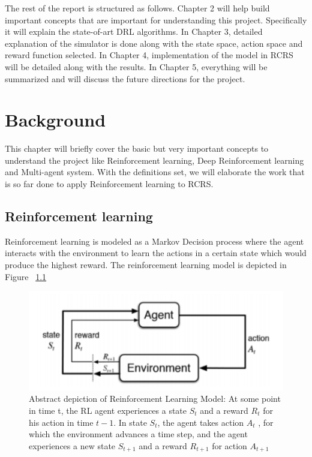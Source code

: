 \documentclass[12pt]{report}
\begin{document}
The rest of the report is structured as follows. Chapter 2 will help build important concepts that are important for understanding this project. Specifically it will explain the state-of-art DRL algorithms. In Chapter 3, detailed explanation of the simulator is done along with the state space, action space and reward function selected. In Chapter 4, implementation of the model in RCRS will be detailed along with the results. In Chapter 5, everything will be summarized and will discuss the future directions for the project. 


\chapter{Background}                       

This chapter will briefly cover the basic but very important concepts to understand the project like Reinforcement learning, Deep Reinforcement learning and Multi-agent system. With the definitions set, we will elaborate the work that is so far done to apply Reinforcement learning to RCRS. 

\section{Reinforcement learning}

Reinforcement learning is modeled as a Markov Decision process where the agent interacts with the environment to learn the actions in a certain state which would produce the highest reward. The reinforcement learning model is depicted in Figure ~\ref{fig:ReinforcementLearningModel} 

\begin{figure}[!h]
    \centering
    \includegraphics[width=12cm]{ReinforcementLearningModel.png}
    \caption{Abstract depiction of Reinforcement Learning Model: At some point in time t, the RL agent experiences a state $S_t$ and a reward $R_t$ for his action in time $t-1$. In state $S_t$, the agent takes action $A_t$ , for which the environment advances a time step, and the agent experiences a new state $S_{t+1}$ and a reward $R_{t+1}$ for action $A_{t+1}$}
    \label{fig:ReinforcementLearningModel}
\end{figure}
\end{document}
